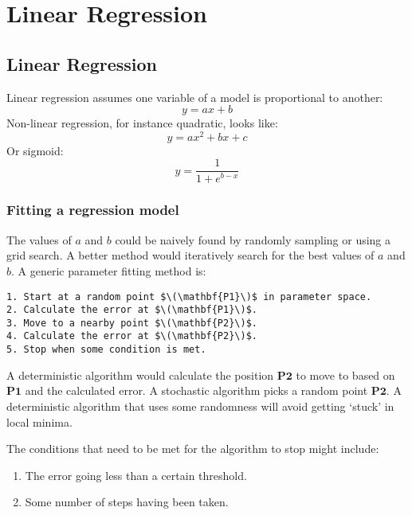 \chapter{Linear Regression}


\section{Linear Regression}
Linear regression assumes one variable of a model is proportional to another:
\begin{equation}
    \label{eq:linear_regression}
    y = ax + b
\end{equation}
Non-linear regression, for instance quadratic, looks like:
\begin{equation*}
    y = ax^2 + bx + c
\end{equation*}
Or sigmoid:
\begin{equation*}
    y = \frac{1}{1 + e ^{b-x}}
\end{equation*}

\subsection{Fitting a regression model}
The values of \(a\) and \(b\) could be naively found by randomly sampling or using a grid search. A better method would iteratively search for the best values of \(a\) and \(b\). A generic parameter fitting method is:
\begin{lstlisting}
1. Start at a random point $\(\mathbf{P1}\)$ in parameter space.
2. Calculate the error at $\(\mathbf{P1}\)$.
3. Move to a nearby point $\(\mathbf{P2}\)$.
4. Calculate the error at $\(\mathbf{P2}\)$.
5. Stop when some condition is met.
\end{lstlisting}
A deterministic algorithm would calculate the position \(\mathbf{P2}\) to move to based on \(\mathbf{P1}\) and the calculated error. A stochastic algorithm picks a random point \(\mathbf{P2}\). A deterministic algorithm that uses some randomness will avoid getting `stuck' in local minima.

The conditions that need to be met for the algorithm to stop might include:
\begin{enumerate}
    \item The error going less than a certain threshold.
    \item Some number of steps having been taken.
\end{enumerate}

